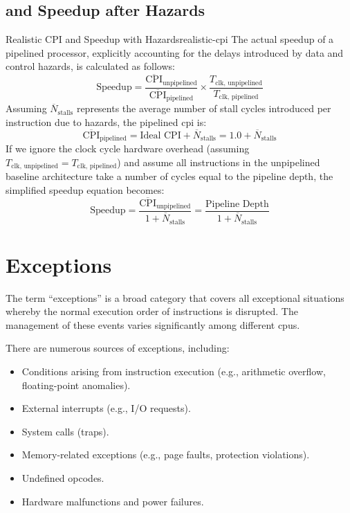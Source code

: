 \subsection{ and Speedup after Hazards}
\begin{concept}{Realistic CPI and Speedup with Hazards}{realistic-cpi}
    The actual speedup of a pipelined processor, explicitly accounting for the delays introduced by data and control hazards, is calculated as follows:
    \[\text{Speedup} = \frac{\overline{\text{CPI}}_{\text{unpipelined}}}{\overline{\text{CPI}}_{\text{pipelined}}} \times \frac{T_{\text{clk, unpipelined}}}{T_{\text{clk, pipelined}}}\]
    Assuming \(\overline{N}_{\text{stalls}}\) represents the average number of stall cycles introduced per instruction due to hazards, the pipelined \gls{cpi} is:
    \[\overline{\text{CPI}}_{\text{pipelined}} = \text{Ideal CPI} + \overline{N}_{\text{stalls}} = 1.0 + \overline{N}_{\text{stalls}}\]
    If we ignore the clock cycle hardware overhead (assuming \(T_{\text{clk, unpipelined}} = T_{\text{clk, pipelined}}\)) and assume all instructions in the unpipelined baseline architecture take a number of cycles equal to the pipeline depth, the simplified speedup equation becomes:
    \[\text{Speedup} = \frac{\overline{\text{CPI}}_{\text{unpipelined}}}{1 + \overline{N}_{\text{stalls}}} = \frac{\text{Pipeline Depth}}{1 + \overline{N}_{\text{stalls}}}\]
\end{concept}

\section{Exceptions}
The term ``exceptions'' is a broad category that covers all exceptional situations whereby the normal execution order of instructions is disrupted. The management of these events varies significantly among different \glspl{cpu}. 

There are numerous sources of exceptions, including:
\begin{itemize}
    \item Conditions arising from instruction execution (e.g., arithmetic overflow, floating-point anomalies).
    \item External interrupts (e.g., I/O requests).
    \item System calls (traps).
    \item Memory-related exceptions (e.g., page faults, protection violations).
    \item Undefined opcodes.
    \item Hardware malfunctions and power failures.
\end{itemize}

